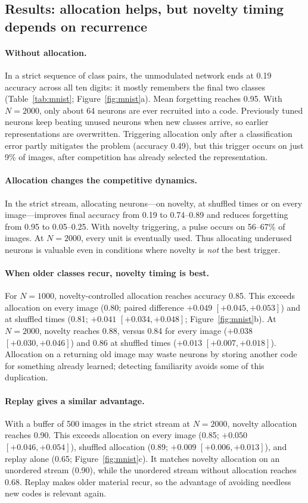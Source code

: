 \documentclass[11pt,a4paper]{article}
\begin{document}
\subsection{Results: allocation helps, but novelty timing depends on recurrence}
\paragraph{Without allocation.}
In a strict sequence of class pairs, the unmodulated network ends at 0.19 accuracy across all ten digits: it mostly remembers the final two classes (Table~\ref{tab:mnist}; Figure~\ref{fig:mnist}a). Mean forgetting reaches 0.95. With $N=2000$, only about 64 neurons are ever recruited into a code. Previously tuned neurons keep beating unused neurons when new classes arrive, so earlier representations are overwritten. Triggering allocation only after a classification error partly mitigates the problem (accuracy 0.49), but this trigger occurs on just 9\% of images, after competition has already selected the representation.

\paragraph{Allocation changes the competitive dynamics.}
In the strict stream, allocating neurons---on novelty, at shuffled times or on every image---improves final accuracy from 0.19 to 0.74--0.89 and reduces forgetting from 0.95 to 0.05--0.25. With novelty triggering, a pulse occurs on 56--67\% of images. At $N=2000$, every unit is eventually used. Thus allocating underused neurons is valuable even in conditions where novelty is \emph{not} the best trigger.

\paragraph{When older classes recur, novelty timing is best.}
For $N=1000$, novelty-controlled allocation reaches accuracy 0.85. This exceeds allocation on every image (0.80; paired difference $+0.049$ $[+0.045,+0.053]$) and at shuffled times (0.81; $+0.041$ $[+0.034,+0.048]$; Figure~\ref{fig:mnist}b). At $N=2000$, novelty reaches 0.88, versus 0.84 for every image ($+0.038$ $[+0.030,+0.046]$) and 0.86 at shuffled times ($+0.013$ $[+0.007,+0.018]$). Allocation on a returning old image may waste neurons by storing another code for something already learned; detecting familiarity avoids some of this duplication.

\paragraph{Replay gives a similar advantage.}
With a buffer of 500 images in the strict stream at $N=2000$, novelty allocation reaches 0.90. This exceeds allocation on every image (0.85; $+0.050$ $[+0.046,+0.054]$), shuffled allocation (0.89; $+0.009$ $[+0.006,+0.013]$), and replay alone (0.65; Figure~\ref{fig:mnist}c). It matches novelty allocation on an unordered stream (0.90), while the unordered stream without allocation reaches 0.68. Replay makes older material recur, so the advantage of avoiding needless new codes is relevant again.
\end{document}
